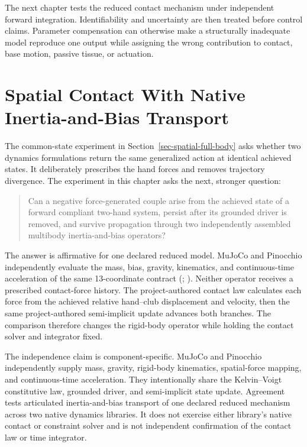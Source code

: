 \documentclass[
  letterpaper,
]{report}
\begin{document}
The next chapter tests the reduced contact mechanism under independent
forward integration. Identifiability and uncertainty are then treated
before control claims. Parameter compensation can otherwise make a
structurally inadequate model reproduce one output while assigning the
wrong contribution to contact, base motion, passive tissue, or
actuation.

\chapter{Spatial Contact With Native Inertia-and-Bias
Transport}\label{sec-spatial-forward-contact}

The common-state experiment in Section~\ref{sec-spatial-full-body} asks
whether two dynamics formulations return the same generalized action at
identical achieved states. It deliberately prescribes the hand forces
and removes trajectory divergence. The experiment in this chapter asks
the next, stronger question:

\begin{quote}
Can a negative force-generated couple arise from the achieved state of a
forward compliant two-hand system, persist after its grounded driver is
removed, and survive propagation through two independently assembled
multibody inertia-and-bias operators?
\end{quote}

The answer is affirmative for one declared reduced model. MuJoCo and
Pinocchio independently evaluate the mass, bias, gravity, kinematics,
and continuous-time acceleration of the same 13-coordinate contract
(;
). Neither
operator receives a prescribed contact-force history. The
project-authored contact law calculates each force from the achieved
relative hand--club displacement and velocity, then the same
project-authored semi-implicit update advances both branches. The
comparison therefore changes the rigid-body operator while holding the
contact solver and integrator fixed.

The independence claim is component-specific. MuJoCo and Pinocchio
independently supply mass, gravity, rigid-body kinematics, spatial-force
mapping, and continuous-time acceleration. They intentionally share the
Kelvin--Voigt constitutive law, grounded driver, and semi-implicit state
update. Agreement tests articulated inertia-and-bias transport of one
declared reduced mechanism across two native dynamics libraries. It does
not exercise either library's native contact or constraint solver and is
not independent confirmation of the contact law or time integrator.
\end{document}
